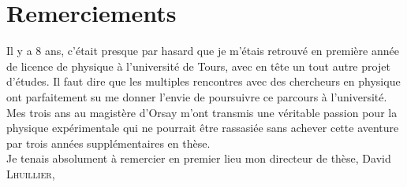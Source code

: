 

\chapter*{Remerciements}
\label{chap:remerciements}

Il y a 8 ans, c'était presque par hasard que je m'étais retrouvé en première année de licence de physique à l'université de Tours, avec en tête un tout autre projet d'études. Il faut dire que les multiples rencontres avec des chercheurs en physique ont parfaitement su me donner l'envie de poursuivre ce parcours à l'université. Mes trois ans au magistère d'Orsay m'ont transmis une véritable passion pour la physique expérimentale qui ne pourrait être rassasiée sans achever cette aventure par trois années supplémentaires en thèse. \\


Je tenais absolument à remercier en premier lieu mon directeur de thèse, David \textsc{Lhuillier}, 


